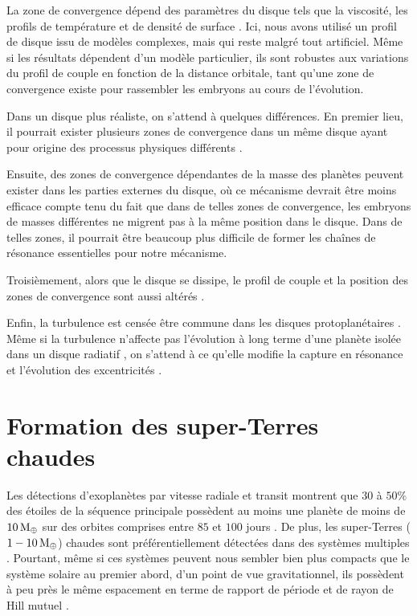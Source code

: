 La zone de convergence dépend des paramètres du disque tels que la viscosité, les profils de température et de densité de surface \citep[voir par exemple][]{paardekooper2011torque}. Ici, nous avons utilisé un profil de disque issu de modèles complexes, mais qui reste malgré tout artificiel. Même si les résultats dépendent d'un modèle particulier, ils sont robustes aux variations du profil de couple en fonction de la distance orbitale, tant qu'une zone de convergence existe pour rassembler les embryons au cours de l'évolution. 

\bigskip

Dans un disque plus réaliste, on s'attend à quelques différences. En premier lieu, il pourrait exister plusieurs zones de convergence dans un même disque ayant pour origine des processus physiques différents \citep{lyra2010orbital, hasegawa2011origin}. 

Ensuite, des zones de convergence dépendantes de la masse des planètes peuvent exister dans les parties externes du disque, où
ce mécanisme devrait être moins efficace compte tenu du fait que dans de telles zones de convergence, les embryons de masses
différentes ne migrent pas à la même position dans le disque. Dans de telles zones, il pourrait être beaucoup plus difficile de
former les chaînes de résonance essentielles pour notre mécanisme.

Troisièmement, alors que le disque se dissipe, le profil de couple et la position des zones de convergence sont aussi altérés \citep{lyra2010orbital, horn2012orbital}. 

Enfin, la turbulence est censée être commune dans les disques protoplanétaires \citep{armitage2011dynamics}. Même si la turbulence n'affecte pas l'évolution à long terme d'une planète isolée dans un disque radiatif \citep{pierens2012protoplanetary}, on s'attend à ce qu'elle modifie la capture en résonance et l'évolution des excentricités \citep[voir][]{pierens2011dynamics}.

\section{Formation des super-Terres chaudes}\label{sec:4.2}
Les détections d'exoplanètes par vitesse radiale et transit montrent que $30$ à $50\%$ des étoiles de la séquence principale possèdent au moins une planète de moins de $10\mathrm{\thinspace M_\oplus}$ sur des orbites comprises entre $85$ et $100$ jours \citep{mayor2011road, howard2010occurrence, howard2012occurrence, fressin2013false}. De plus, les super-Terres ($1-10\mathrm{\thinspace M_\oplus}$) chaudes sont préférentiellement détectées dans des systèmes multiples \citep{udry2007statistical, lissauer2011architecture}. Pourtant, même si ces systèmes peuvent nous sembler bien plus compacts que le système solaire au premier abord, d'un point de vue gravitationnel, ils possèdent à peu près le même espacement en terme de rapport de période et de rayon de Hill mutuel \citep{fang2013planetary}.


